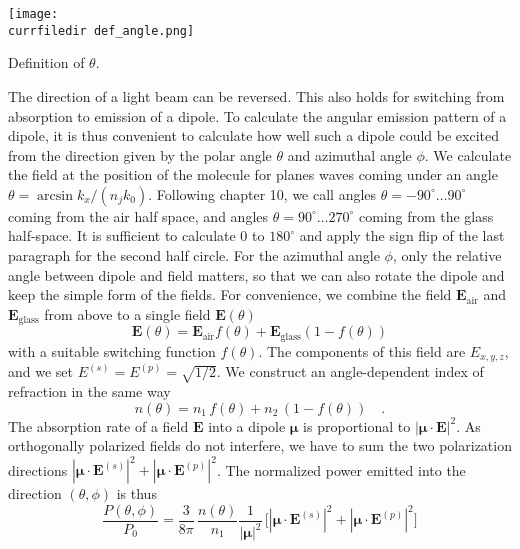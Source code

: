 \begin{marginfigure}
  \texttt{[image: \\currfiledir def\_angle.png]}
  \caption{Definition of $\theta$.}
\end{marginfigure}


The direction of  a light beam can be reversed. This also holds for switching from absorption to emission of a dipole. To calculate the angular emission pattern of a dipole, it is thus convenient to calculate how well such a dipole could be excited from the  direction given by the polar angle $\theta$ and azimuthal angle $\phi$. We calculate the field at the position of the molecule for planes waves coming under an angle $\theta = \arcsin k_x / (n_j k_0)$. Following \cite{Novotny-Hecht2012} chapter 10, we call angles $\theta = -90^\circ \dots 90^\circ$ coming from the air half space, and angles $\theta = 90^\circ \dots 270^\circ$ coming from the glass half-space. It is sufficient to calculate $0$ to $180^\circ$ and apply the sign flip of the last paragraph for the second half circle.  For the azimuthal angle $\phi$, only the relative angle between dipole and field matters, so that we can also rotate the dipole and keep the simple form of the fields. For convenience, we combine the field $\mathbf{E}_\text{air}$ and $\mathbf{E}_\text{glass}$ from above to a single field $\mathbf{E}(\theta)$
\begin{equation}
\mathbf{E}(\theta) = \mathbf{E}_\text{air} f(\theta) + \mathbf{E}_\text{glass} (1 - f(\theta))
\end{equation}
with a suitable switching function $f(\theta)$. The components of this field are $E_{x,y,z}$, and we set $ E^{(s)}= E^{(p)} = \sqrt{1/2}$. We construct an angle-dependent index of refraction in the same way
\begin{equation}
n(\theta) =n_1 \,  f(\theta) + n_2 \, (1 - f(\theta)) \quad .
\end{equation}
The absorption rate of a field $\mathbf{E}$ into  a dipole $\mathbf{\mu}$ is proportional to $|\mathbf{\mu} \cdot \mathbf{E}|^2$. As orthogonally polarized fields do not interfere, we have to sum  the two polarization directions 
$ \left|\mathbf{\mu} \cdot \mathbf{E}^{(s)} \right|^2
  + \left|\mathbf{\mu} \cdot \mathbf{E}^{(p)} \right|^2$. 
The normalized  power emitted into the direction $(\theta, \phi)$ is thus 
\begin{equation} \label{eq:dipole_P_dipole_pattern}
\frac{P(\theta, \phi)}{P_0} = 
\frac{3}{8 \pi} \, \frac{n(\theta)}{n_1} \frac{1}{|\mathbf{\mu}|^2} \, 
\biggl[  \left|\mathbf{\mu} \cdot \mathbf{E}^{(s)} \right|^2
+ \left|\mathbf{\mu} \cdot \mathbf{E}^{(p)} \right|^2 \biggr] 
\end{equation}
